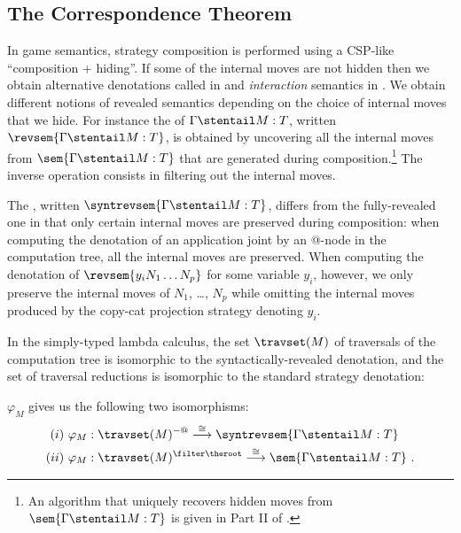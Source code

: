\subsection{The Correspondence Theorem}

In game semantics, strategy composition is performed using a
CSP-like ``composition + hiding''. If some of the internal moves are
not hidden then we obtain alternative denotations called
 in \cite{willgreenlandthesis} and
\emph{interaction} semantics in \cite{DBLP:conf/sas/DimovskiGL05}.
We obtain different notions of revealed semantics depending on the
choice of internal moves that we hide. For instance the
 of $\Gamma \stentail M
:T$, written $\revsem{\Gamma \stentail M : T}$, is obtained by
uncovering all the internal moves from $\sem{\Gamma \stentail M :
T}$ that are generated during composition.\footnote{An algorithm
that uniquely recovers hidden moves from $\sem{\Gamma \stentail M :
T}$ is given in Part II of
  \cite{hylandong_pcf}.} The inverse operation consists in filtering out the internal moves.

The , written
$\syntrevsem{\Gamma \stentail M : T}$, differs from the
fully-revealed one in that only certain internal moves are preserved
during composition: when computing the denotation of an application
joint by an @-node in the computation tree, all the internal moves
are preserved. When computing the denotation of $\revsem{y_i N_1
\ldots N_p}$ for some variable $y_i$, however, we only preserve the
internal moves of $N_1$, \ldots, $N_p$ while omitting the internal
moves produced by the copy-cat projection strategy denoting $y_i$.


In the simply-typed lambda calculus, the set $\travset(M)$ of
traversals of the computation tree is isomorphic to the
syntactically-revealed denotation, and the set of traversal
reductions is isomorphic to the standard strategy denotation:
\begin{theorem}
\label{thm:correspondence} $\varphi_M$ gives us the following two
isomorphisms:
\begin{eqnarray*}
(i)~\varphi_M  &: \travset(M)^{-@} \stackrel{\cong}{\longrightarrow} \syntrevsem{\Gamma \stentail M :T} \\
(ii)~\varphi_M  &: \travset(M )^{\filter \theroot} \stackrel{\cong}{\longrightarrow} \sem{\Gamma \stentail M : T} \ .
\end{eqnarray*}
\end{theorem}
\bigskip

